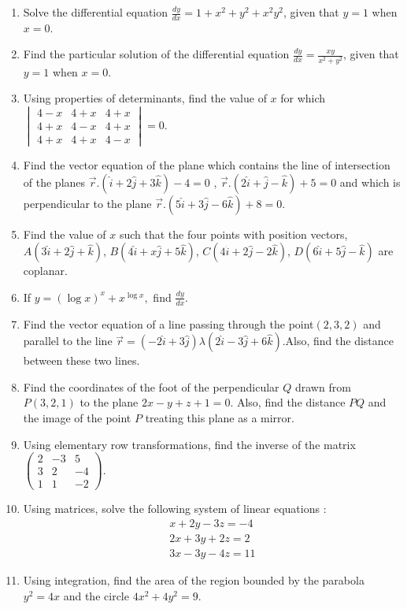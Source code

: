 \documentclass[10pt,-letter paper]{article}
\providecommand{\brak}[1]{\ensuremath{\left(#1\right)}}
\newcommand{\myvec}[1]{\ensuremath{\begin{pmatrix}#1\end{pmatrix}}}
\newcommand{\mydet}[1]{\ensuremath{\begin{vmatrix}#1\end{vmatrix}}}
\begin{document}
\begin{enumerate}
\item Solve the differential equation $\frac{dy} {dx} =1+x^{2}+y^{2}+x^{2}y^{2}$, given that $y = 1$ when $x = 0$.
\item Find the particular solution of the differential equation $\frac{dy}{dx}=\frac{xy}{x^{2}+y^{2}}$, given that $y = 1$ when $x = 0$.
\item Using properties of determinants, find the value of $x$ for which $\mydet{4-x & 4+x & 4+x \\ 4+x & 4-x & 4+x \\ 4+x & 4+x & 4-x}=0$.
\item Find the vector equation of the plane which contains the line of intersection of the planes $ \overrightarrow{r}.\brak{\hat{i} + 2\hat{j}+3\hat{k}}-4=0$ , $\overrightarrow{r}.\brak{2\hat{i} + \hat{j} - \hat{k}}+5=0$ and which is perpendicular to the plane $\overrightarrow{r}.\brak{5\hat{i} + 3\hat{j} - 6\hat{k}}+8=0$.
\item Find the value of $x$ such that the four points with position vectors,$A\brak{3\hat{i} + 2\hat{j} + \hat{k}}$, $B\brak{4\hat{i} + x\hat{j} + 5\hat{k}}$, $C\brak{4\hat{i} + 2\hat{j} -2 \hat{k}}$, $D\brak{6\hat{i} + 5\hat{j} - \hat{k}}$ are coplanar.
\item If $y=\brak{\log x}^{x}+x^{\log x},$ find $\frac{dy}{dx}$.
\item Find the vector equation of a line passing through the point$\brak{2, 3, 2}$ and parallel to the line $\overrightarrow{r}=\brak{-2\hat{i} +3\hat{j}}\lambda\brak{2\hat{i} - 3\hat{j}+6\hat{k}}$.Also, find the distance between these two lines.
\item Find the coordinates of the foot of the perpendicular ${Q}$ drawn from ${P}\brak{3, 2, 1}$ to the plane $2x - y + z + 1 = 0$. Also, find the distance ${P}{Q}$ and the image of the point ${P}$ treating this plane as a mirror.
\item Using elementary row transformations, find the inverse of the matrix $\myvec{2 & -3 &5 \\ 3 & 2 & -4 \\ 1 & 1 & -2}$.
\item Using matrices, solve the following system of linear equations :
	\begin{align*}
		x+2y-3z=-4\\
		2x+3y+2z=2\\
		3x-3y-4z=11
	\end{align*}
\item Using integration, find the area of the region bounded by the parabola $y^{2}=4x$ and the circle $4x^{2}+4y^{2}=9$.

\end{enumerate}
\end{document}
